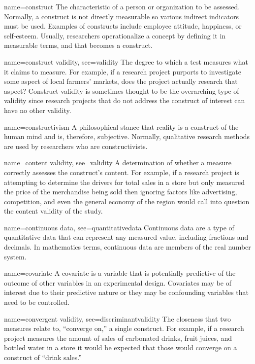 {name={construct}}
{%
	The characteristic of a person or organization to be assessed. Normally, a construct is not directly measurable so various indirect indicators must be used. Examples of constructs include employee attitude, happiness, or self-esteem. Usually, researchers operationalize a concept by defining it in measurable terms, and that becomes a construct.
}

{name={construct validity},
	see={validity}}
{%
	The degree to which a test measures what it claims to measure. For example, if a research project purports to investigate some aspect of local farmers' markets, does the project actually research that aspect? Construct validity is sometimes thought to be the overarching type of validity since research projects that do not address the construct of interest can have no other validity.
}

{name={constructivism}}
{%
	A philosophical stance that reality is a construct of the human mind and is, therefore, subjective. Normally, qualitative research methods are used by researchers who are constructivists.
}

{name={content validity},
	see={validity}}
{%
	A determination of whether a measure correctly assesses the construct's content. For example, if a research project is attempting to determine the drivers for total sales in a store but only measured the price of the merchandise being sold then ignoring factors like advertising, competition, and even the general economy of the region would call into question the content validity of the study.
}

{name={continuous data},
	see={quantitativedata}}
{%
	Continuous data are a type of quantitative data that can represent any measured value, including fractions and decimals. In mathematics terms, continuous data are members of the real number system. 
}


{name={covariate}}
{%
	A covariate is a variable that is potentially predictive of the outcome of other variables in an experimental design. Covariates may be of interest due to their predictive nature or they may be confounding variables that need to be controlled.
}

{name={convergent validity},
	see={discriminantvalidity}}
{%
	The closeness that two measures relate to, ``converge on,'' a single construct. For example, if a research project measures the amount of sales of carbonated drinks, fruit juices, and bottled water in a store it would be expected that those would converge on a construct of ``drink sales.''
}

